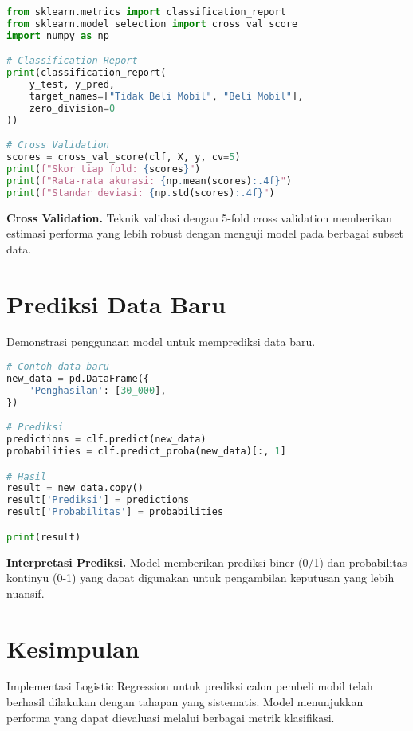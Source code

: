 \documentclass[11pt,a4paper]{article}
\begin{document}
    \begin{codebox}
        \begin{lstlisting}[language=Python]
from sklearn.metrics import classification_report
from sklearn.model_selection import cross_val_score
import numpy as np

# Classification Report
print(classification_report(
    y_test, y_pred,
    target_names=["Tidak Beli Mobil", "Beli Mobil"],
    zero_division=0
))

# Cross Validation
scores = cross_val_score(clf, X, y, cv=5)
print(f"Skor tiap fold: {scores}")
print(f"Rata-rata akurasi: {np.mean(scores):.4f}")
print(f"Standar deviasi: {np.std(scores):.4f}")
        \end{lstlisting}
    \end{codebox}

    \noindent\textbf{Cross Validation.} Teknik validasi dengan 5-fold cross validation memberikan estimasi performa yang lebih robust dengan menguji model pada berbagai subset data.


    \section{Prediksi Data Baru}
    Demonstrasi penggunaan model untuk memprediksi data baru.

    \begin{codebox}
        \begin{lstlisting}[language=Python]
# Contoh data baru
new_data = pd.DataFrame({
    'Penghasilan': [30_000],
})

# Prediksi
predictions = clf.predict(new_data)
probabilities = clf.predict_proba(new_data)[:, 1]

# Hasil
result = new_data.copy()
result['Prediksi'] = predictions
result['Probabilitas'] = probabilities

print(result)
        \end{lstlisting}
    \end{codebox}

    \noindent\textbf{Interpretasi Prediksi.} Model memberikan prediksi biner (0/1) dan probabilitas kontinyu (0-1) yang dapat digunakan untuk pengambilan keputusan yang lebih nuansif.


    \section{Kesimpulan}
    Implementasi Logistic Regression untuk prediksi calon pembeli mobil telah berhasil dilakukan dengan tahapan yang sistematis. Model menunjukkan performa yang dapat dievaluasi melalui berbagai metrik klasifikasi.
\end{document}
